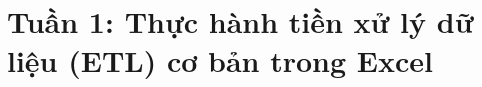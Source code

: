 \documentclass{article}
\begin{document}
\tableofcontents
\newpage
\listoffigures
\newpage
\section{Tuần 1: Thực hành tiền xử lý dữ liệu (ETL) cơ bản trong Excel}






\end{document}
